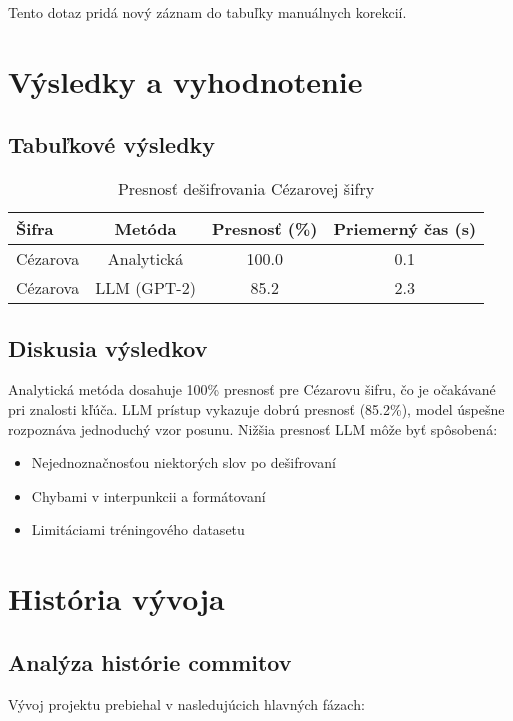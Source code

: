 \documentclass[12pt,a4paper]{article}
\begin{document}
Tento dotaz pridá nový záznam do tabuľky manuálnych korekcií.

\section{Výsledky a vyhodnotenie}
\subsection{Tabuľkové výsledky}
\begin{table}[H]
\centering
\caption{Presnosť dešifrovania Cézarovej šifry}
\begin{tabular}{lccc}
\toprule
\textbf{Šifra} & \textbf{Metóda} & \textbf{Presnosť (\%)} & \textbf{Priemerný čas (s)}\\
\midrule
Cézarova & Analytická & 100.0 & 0.1\\
Cézarova & LLM (GPT-2) & 85.2 & 2.3\\
\bottomrule
\end{tabular}
\label{tab:accuracy}
\end{table}

\subsection{Diskusia výsledkov}
Analytická metóda dosahuje 100\% presnosť pre Cézarovu šifru, čo je očakávané pri znalosti kľúča. LLM prístup vykazuje dobrú presnosť (85.2\%), model úspešne rozpoznáva jednoduchý vzor posunu. Nižšia presnosť LLM môže byť spôsobená:
\begin{itemize}
    \item Nejednoznačnosťou niektorých slov po dešifrovaní
    \item Chybami v interpunkcii a formátovaní
    \item Limitáciami tréningového datasetu
\end{itemize}

\section{História vývoja}
\subsection{Analýza histórie commitov}
Vývoj projektu prebiehal v nasledujúcich hlavných fázach:
\end{document}
